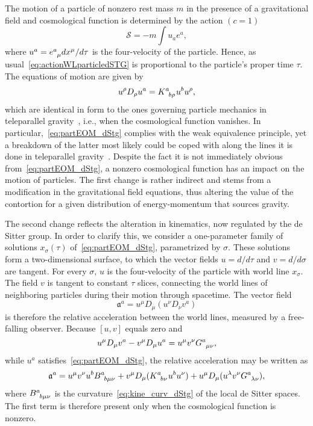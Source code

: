 \documentclass[%
5p,
times,
sort&compress
]{elsarticle}
\newcommand{\ind}{\indices}
\def\mf{\mathfrak}
\def\mc{\mathcal}
\begin{document}
The motion of a particle of nonzero rest mass $m$ in the presence 
of a gravitational field and cosmological function is determined 
by the action $(c = 1)$
\begin{equation}
\label{eq:actionWLparticledSTG}
  \mc{S} = -m \int u_a e^a,
\end{equation}
where $u^a = e\ind{^a_\mu} dx^\mu/d\tau$ is the four-velocity of 
the particle. Hence, as usual~\eqref{eq:actionWLparticledSTG} is 
proportional to the particle's proper time $\tau$. The equations 
of motion are given by
\begin{equation}
\label{eq:partEOM_dStg}
  u^\rho D_\rho u^a = K\ind{^a_{b\rho}} u^b u^\rho,
\end{equation}
which are identical in form to the ones governing particle 
mechanics in teleparallel gravity~\cite{deAndrade:1997qt}, i.e., 
when the cosmological function vanishes. In 
particular,~\eqref{eq:partEOM_dStg} complies with the weak 
equivalence principle, yet a breakdown of the latter most likely 
could be coped with along the lines it is done in teleparallel 
gravity~\cite{Aldrovandi:2003pa}. Despite the fact it is not 
immediately obvious from~\eqref{eq:partEOM_dStg}, a nonzero 
cosmological function has an impact on the motion of particles.  
The first change is rather indirect and stems from a modification 
in the gravitational field equations, thus altering the value of 
the contortion for a given distribution of energy-momentum that 
sources gravity. 

The second change reflects the alteration in kinematics, now 
regulated by the de Sitter group. In order to clarify this, we 
consider a one-parameter family of solutions $x_\sigma(\tau)$ 
of~\eqref{eq:partEOM_dStg}, parametrized by $\sigma$.  These 
solutions form a two-dimensional surface, to which the vector 
fields $u = d/d\tau$ and $v = d/d\sigma$ are tangent. For every 
$\sigma$, $u$ is the four-velocity of the particle with world 
line $x_\sigma$. The field $v$ is tangent to constant $\tau$ 
slices, connecting the world lines of neighboring particles 
during their motion through spacetime. The vector 
field~\cite{carroll:sg}
\begin{equation*}
  \mf{a}^a = u^\mu D_\mu (u^\nu D_\nu v^a)
\end{equation*}
is therefore the relative acceleration between the world lines, 
measured by a free-falling observer. Because $[u,v]$ equals zero 
and
\begin{equation*}
u^\mu D_\mu v^a - v^\mu D_\mu u^a = u^\mu v^\nu 
G\ind{^a_{\mu\nu}},
\end{equation*}
while $u^a$ satisfies~\eqref{eq:partEOM_dStg}, the relative 
acceleration may be written as
\begin{equation}
\label{eq:rel_acc_dStg}
  \mf{a}^a = u^\mu v^\nu u^b B\ind{^a_{b\mu\nu}}
  + v^\mu D_\mu (K\ind{^a_{b\nu}} u^b u^\nu) + u^\mu D_\mu 
  (u^\lambda v^\nu G\ind{^a_{\lambda\nu}}),
\end{equation}
where $B\ind{^a_{b\mu\nu}}$ is the
curvature~\eqref{eq:kine_curv_dStg} of the local de Sitter 
spaces. The first term is therefore present only when the 
cosmological function is nonzero.
\end{document}
